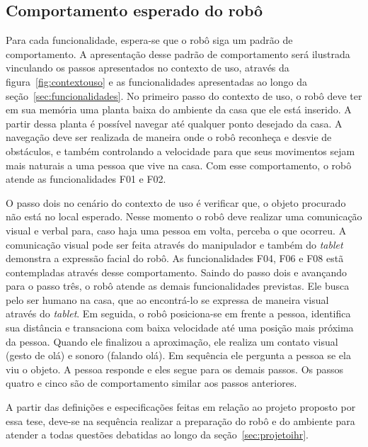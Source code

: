 \subsection{Comportamento esperado do robô}
\label{sec:comportamentoesperado}
Para cada funcionalidade, espera-se que o robô siga um padrão de comportamento. A apresentação desse padrão de comportamento será ilustrada vinculando os passos apresentados no contexto de uso, através da figura~\ref{fig:contextouso} e as funcionalidades apresentadas ao longo da seção~\ref{sec:funcionalidades}. No primeiro passo do contexto de uso, o robô deve ter em sua memória uma planta baixa do ambiente da casa que ele está inserido. A partir dessa planta é possível navegar até qualquer ponto desejado da casa. A navegação deve ser realizada de maneira onde o robô reconheça e desvie de obstáculos, e também controlando a velocidade para que seus movimentos sejam mais naturais a uma pessoa que vive na casa. Com esse comportamento, o robô atende as funcionalidades F01 e F02.

O passo dois no cenário do contexto de uso é verificar que, o objeto procurado não está no local esperado. Nesse momento o robô deve realizar uma comunicação visual e verbal para, caso haja uma pessoa em volta, perceba o que ocorreu. A comunicação visual pode ser feita através do manipulador e também do \emph{tablet} demonstra a expressão facial do robô. As funcionalidades F04, F06 e F08 estã contempladas através desse comportamento. Saindo do passo dois e avançando para o passo três, o robô atende as demais funcionalidades previstas. Ele busca pelo ser humano na casa, que ao encontrá-lo se expressa de maneira visual através do \emph{tablet}. Em seguida, o robô posiciona-se em frente a pessoa, identifica sua distância e transaciona com baixa velocidade até uma posição mais próxima da pessoa. Quando ele finalizou a aproximação, ele realiza um contato visual (gesto de olá) e sonoro (falando olá). Em sequência ele pergunta a pessoa se ela viu o objeto. A pessoa responde e eles segue para os demais passos. Os passos quatro e cinco são de comportamento similar aos passos anteriores.

A partir das definições e especificações feitas em relação ao projeto proposto por essa tese, deve-se na sequência realizar a preparação do robô e do ambiente para atender a todas questões debatidas ao longo da seção~\ref{sec:projetoihr}.
